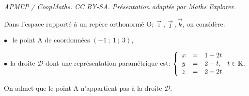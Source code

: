 \documentclass[10pt]{article}
\providecommand{\R}{\mathbb{R}}
\providecommand{\Oijk}{\(\mathrm{O};\vec{\imath},\vec{\jmath},\vec{k}\)}
\begin{document}
\noindent\textit{APMEP / CoopMaths. CC BY-SA. Présentation adaptée par Maths Explorer.}\par\medskip
\medskip

Dans l'espace rapporté à un repère orthonormé \Oijk, on considère:

$\bullet~~$ le point A de coordonnées $(-1~;~1~;~3)$,

$\bullet~~$la droite $\mathcal{D}$ dont une représentation paramétrique est: $\left\{\begin{array}{l c l}
x&=&1+2t\\y &=& 2 - t,\\z&=& 2+2t
\end{array}\right.  t \in \R$.

On admet que le point A n'appartient pas à la droite $\mathcal{D}$.

\medskip
\end{document}
